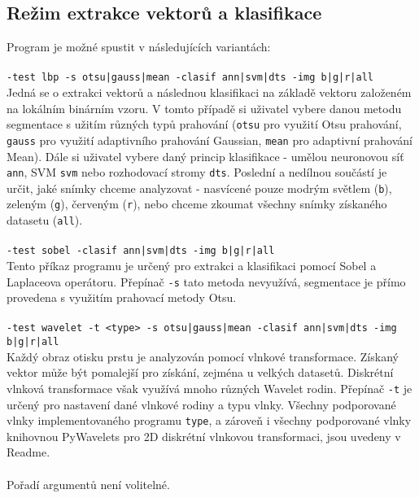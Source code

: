 \subsection*{Režim extrakce vektorů a klasifikace}
Program je možné spustit v následujících variantách:\\\\
\verb=-test lbp -s otsu|gauss|mean -clasif ann|svm|dts -img b|g|r|all=\\
Jedná se o extrakci vektorů a následnou klasifikaci na základě vektoru založeném na lokálním binárním vzoru. V tomto případě si uživatel vybere danou metodu segmentace s užitím různých typů prahování (\verb=otsu= pro využití Otsu prahování, \verb=gauss= pro využití adaptivního prahování Gaussian, \verb=mean= pro adaptivní prahování Mean). Dále si uživatel vybere daný princip klasifikace - umělou neuronovou síť \verb=ann=, SVM \verb=svm= nebo rozhodovací stromy \verb=dts=. Poslední a nedílnou součástí je určit, jaké snímky chceme analyzovat - nasvícené pouze modrým světlem (\verb=b=), zeleným (\verb=g=), červeným (\verb=r=), nebo chceme zkoumat všechny snímky získaného datasetu (\verb=all=).\\\\
\verb=-test sobel -clasif ann|svm|dts -img b|g|r|all=\\
Tento příkaz programu je určený pro extrakci a klasifikaci pomocí Sobel a Laplaceova operátoru. Přepínač \verb=-s= tato metoda nevyužívá, segmentace je přímo provedena s využitím prahovací metody Otsu.\\\\
\verb=-test wavelet -t <type> -s otsu|gauss|mean -clasif ann|svm|dts -img b|g|r|all=\\
Každý obraz otisku prstu je analyzován pomocí vlnkové transformace. Získaný vektor může být pomalejší pro získání, zejména u velkých datasetů. Diskrétní vlnková transformace však využívá mnoho různých Wavelet rodin. Přepínač \verb=-t= je určený pro nastavení dané vlnkové rodiny a typu vlnky. Všechny podporované vlnky implementovaného programu \verb=type=, a zároveň i všechny podporované vlnky knihovnou PyWavelets pro 2D diskrétní vlnkovou transformaci, jsou uvedeny v Readme.\\\\
\noindent
Pořadí argumentů není volitelné.

